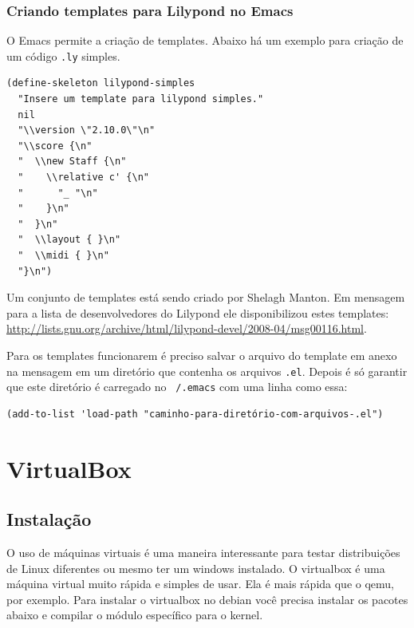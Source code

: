\documentclass[12pt,brazil]{book}
\begin{document}
\subsection{Criando templates para Lilypond no Emacs}
\label{sec:criando-templ-para}

O Emacs permite a criação de templates. Abaixo há um exemplo para
criação de um código \texttt{.ly} simples.

\begin{verbatim}
(define-skeleton lilypond-simples
  "Insere um template para lilypond simples."
  nil
  "\\version \"2.10.0\"\n"
  "\\score {\n"
  "  \\new Staff {\n"
  "    \\relative c' {\n"
  "      "_ "\n"
  "    }\n"
  "  }\n"
  "  \\layout { }\n"
  "  \\midi { }\n"
  "}\n")
\end{verbatim}

Um conjunto de templates está sendo criado por Shelagh Manton. Em
mensagem para a lista de desenvolvedores do Lilypond ele
disponibilizou estes templates:
\url{http://lists.gnu.org/archive/html/lilypond-devel/2008-04/msg00116.html}.

Para os templates funcionarem é preciso salvar o arquivo do template
em anexo na mensagem em um diretório que contenha os arquivos
\texttt{.el}. Depois é só garantir que este diretório é carregado no
\texttt{~/.emacs} com uma linha como essa:

\begin{verbatim}
(add-to-list 'load-path "caminho-para-diretório-com-arquivos-.el")
\end{verbatim}

\chapter{VirtualBox}
\label{cha:virtualbox}

\section{Instalação}
\label{sec:instalacao-6}

O uso de máquinas virtuais é uma maneira interessante para testar
distribuições de Linux diferentes ou mesmo ter um windows instalado.
O virtualbox é uma máquina virtual muito rápida e simples de usar. Ela
é mais rápida que o qemu, por exemplo. Para instalar o virtualbox no
debian você precisa instalar os pacotes abaixo e compilar o módulo
específico para o kernel.
\end{document}
